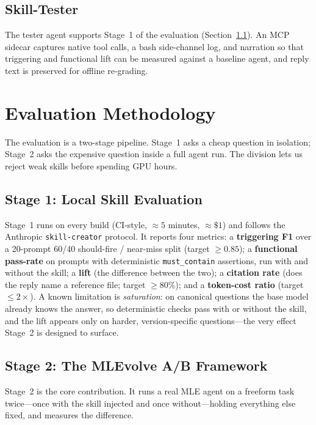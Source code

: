 \documentclass[11pt,a4paper]{article}
\begin{document}
\subsection{Skill-Tester}

The tester agent supports Stage~1 of the evaluation (Section~\ref{sec:stage1}). An MCP
sidecar captures native tool calls, a bash side-channel log, and narration so that
triggering and functional lift can be measured against a baseline agent, and reply text
is preserved for offline re-grading.

\section{Evaluation Methodology}

The evaluation is a two-stage pipeline. Stage~1 asks a cheap question in isolation;
Stage~2 asks the expensive question inside a full agent run. The division lets us reject
weak skills before spending GPU hours.

\subsection{Stage 1: Local Skill Evaluation}
\label{sec:stage1}

Stage~1 runs on every build (CI-style, $\approx 5$ minutes, $\approx \$1$) and follows
the Anthropic \texttt{skill-creator} protocol. It reports four metrics: a
\textbf{triggering F1} over a 20-prompt 60/40 should-fire / near-miss split (target
$\geq 0.85$); a \textbf{functional pass-rate} on prompts with deterministic
\texttt{must\_contain} assertions, run with and without the skill; a \textbf{lift} (the
difference between the two); a \textbf{citation rate} (does the reply name a reference
file; target $\geq 80\%$); and a \textbf{token-cost ratio} (target $\leq 2\times$).
A known limitation is \emph{saturation}: on canonical questions the base model already
knows the answer, so deterministic checks pass with or without the skill, and the lift
appears only on harder, version-specific questions---the very effect Stage~2 is designed
to surface.

\subsection{Stage 2: The MLEvolve A/B Framework}

Stage~2 is the core contribution. It runs a real MLE agent on a freeform task twice---once
with the skill injected and once without---holding everything else fixed, and measures the
difference.
\end{document}
